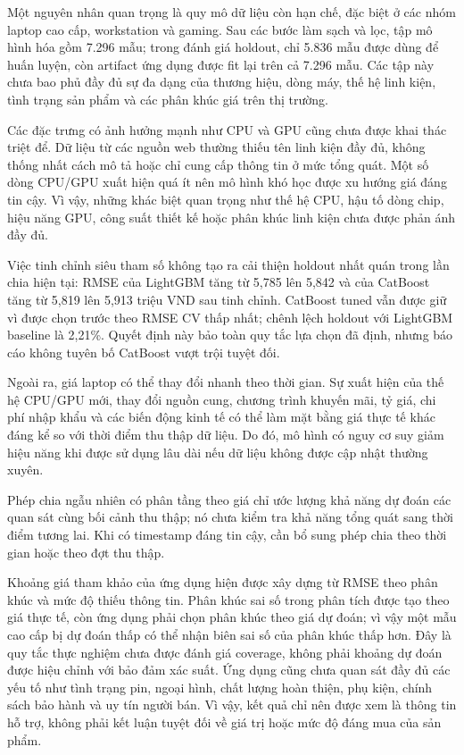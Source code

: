 Một nguyên nhân quan trọng là quy mô dữ liệu còn hạn chế, đặc biệt ở các nhóm laptop cao cấp, workstation và gaming. Sau các bước làm sạch và lọc, tập mô hình hóa gồm 7.296 mẫu; trong đánh giá holdout, chỉ 5.836 mẫu được dùng để huấn luyện, còn artifact ứng dụng được fit lại trên cả 7.296 mẫu. Các tập này chưa bao phủ đầy đủ sự đa dạng của thương hiệu, dòng máy, thế hệ linh kiện, tình trạng sản phẩm và các phân khúc giá trên thị trường.

Các đặc trưng có ảnh hưởng mạnh như CPU và GPU cũng chưa được khai thác triệt để. Dữ liệu từ các nguồn web thường thiếu tên linh kiện đầy đủ, không thống nhất cách mô tả hoặc chỉ cung cấp thông tin ở mức tổng quát. Một số dòng CPU/GPU xuất hiện quá ít nên mô hình khó học được xu hướng giá đáng tin cậy. Vì vậy, những khác biệt quan trọng như thế hệ CPU, hậu tố dòng chip, hiệu năng GPU, công suất thiết kế hoặc phân khúc linh kiện chưa được phản ánh đầy đủ.

Việc tinh chỉnh siêu tham số không tạo ra cải thiện holdout nhất quán trong lần chia hiện tại: RMSE của LightGBM tăng từ 5,785 lên 5,842 và của CatBoost tăng từ 5,819 lên 5,913 triệu VND sau tinh chỉnh. CatBoost tuned vẫn được giữ vì được chọn trước theo RMSE CV thấp nhất; chênh lệch holdout với LightGBM baseline là 2,21\%. Quyết định này bảo toàn quy tắc lựa chọn đã định, nhưng báo cáo không tuyên bố CatBoost vượt trội tuyệt đối.

Ngoài ra, giá laptop có thể thay đổi nhanh theo thời gian. Sự xuất hiện của thế hệ CPU/GPU mới, thay đổi nguồn cung, chương trình khuyến mãi, tỷ giá, chi phí nhập khẩu và các biến động kinh tế có thể làm mặt bằng giá thực tế khác đáng kể so với thời điểm thu thập dữ liệu. Do đó, mô hình có nguy cơ suy giảm hiệu năng khi được sử dụng lâu dài nếu dữ liệu không được cập nhật thường xuyên.

Phép chia ngẫu nhiên có phân tầng theo giá chỉ ước lượng khả năng dự đoán các quan sát cùng bối cảnh thu thập; nó chưa kiểm tra khả năng tổng quát sang thời điểm tương lai. Khi có timestamp đáng tin cậy, cần bổ sung phép chia theo thời gian hoặc theo đợt thu thập.

Khoảng giá tham khảo của ứng dụng hiện được xây dựng từ RMSE theo phân khúc và mức độ thiếu thông tin. Phân khúc sai số trong phân tích được tạo theo giá thực tế, còn ứng dụng phải chọn phân khúc theo giá dự đoán; vì vậy một mẫu cao cấp bị dự đoán thấp có thể nhận biên sai số của phân khúc thấp hơn. Đây là quy tắc thực nghiệm chưa được đánh giá coverage, không phải khoảng dự đoán được hiệu chỉnh với bảo đảm xác suất. Ứng dụng cũng chưa quan sát đầy đủ các yếu tố như tình trạng pin, ngoại hình, chất lượng hoàn thiện, phụ kiện, chính sách bảo hành và uy tín người bán. Vì vậy, kết quả chỉ nên được xem là thông tin hỗ trợ, không phải kết luận tuyệt đối về giá trị hoặc mức độ đáng mua của sản phẩm.

